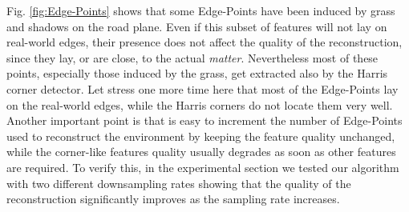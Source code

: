 Fig. \ref{fig:Edge-Points} shows that some Edge-Points have been induced by grass and shadows on the road plane. Even if this subset of features will not lay on real-world edges, their presence does not affect the quality of the reconstruction, since they lay, or are close, to the actual \emph{matter}.
Nevertheless most of these points, especially those induced by the grass, get extracted also by the Harris corner detector. 
Let stress one more time here that most of the Edge-Points lay on the real-world edges, while the Harris corners do not locate them very well.
Another important point is that is easy to increment the number of Edge-Points used to reconstruct the environment by keeping the feature quality unchanged, while the corner-like features quality usually degrades as soon as other features are required. 
To verify this, in the experimental section we tested our algorithm with two different downsampling rates showing that the quality of the reconstruction significantly improves as the sampling rate increases. 


